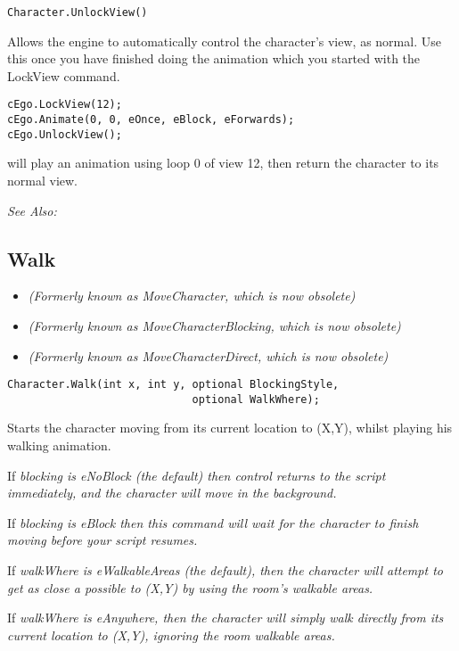 \begin{verbatim}
Character.UnlockView()
\end{verbatim}
Allows the engine to automatically control the character's view, as normal.
Use this once you have finished doing the animation which you started with
the LockView command.

\begin{verbatim}
cEgo.LockView(12);
cEgo.Animate(0, 0, eOnce, eBlock, eForwards);
cEgo.UnlockView();
\end{verbatim}
will play an animation using loop 0 of view 12, then return the character to its normal view.

\it{See Also:} 



\subsection{Walk}\label{Character.Walk}%

\begin{itemize}
\item \it{(Formerly known as MoveCharacter, which is now obsolete)}
\item \it{(Formerly known as MoveCharacterBlocking, which is now obsolete)}
\item \it{(Formerly known as MoveCharacterDirect, which is now obsolete)}
\end{itemize}

\begin{verbatim}
Character.Walk(int x, int y, optional BlockingStyle,
                             optional WalkWhere);
\end{verbatim}
Starts the character moving from its current location to (X,Y), whilst playing
his walking animation.

If \it{blocking} is eNoBlock (the default) then control returns to the script immediately, and
the character will move in the background.

If \it{blocking} is eBlock then this command will wait for the character
to finish moving before your script resumes.

If \it{walkWhere} is eWalkableAreas (the default), then the character will attempt to
get as close a possible to (X,Y) by using the room's walkable areas.

If \it{walkWhere} is eAnywhere, then the character will simply walk directly from its
current location to (X,Y), ignoring the room walkable areas.

